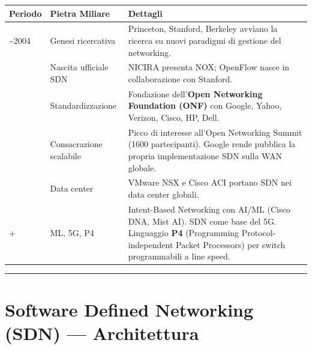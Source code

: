 \documentclass[
  italian,
  openany]{book}
\newcounter{none} %
\begin{document}
{\def\LTcaptype{none} %
\begin{longtable}[]{@{}
  >{\raggedright\arraybackslash}p{}
  >{\raggedright\arraybackslash}p{}
  >{\raggedright\arraybackslash}p{}@{}}
\toprule\noalign{}
\begin{minipage}[b]{\linewidth}\raggedright
\textbf{Periodo}
\end{minipage} & \begin{minipage}[b]{\linewidth}\raggedright
\textbf{Pietra Miliare}
\end{minipage} & \begin{minipage}[b]{\linewidth}\raggedright
\textbf{Dettagli}
\end{minipage} \\
\midrule\noalign{}
\endhead
\bottomrule\noalign{}
\endlastfoot
\textasciitilde2004 & Genesi ricercativa & Princeton, Stanford, Berkeley
avviano la ricerca su nuovi paradigmi di gestione del networking. \\
2008 & Nascita ufficiale SDN & NICIRA presenta NOX; OpenFlow nasce in
collaborazione con Stanford. \\
2011 & Standardizzazione & Fondazione dell'\textbf{Open Networking
Foundation (ONF)} con Google, Yahoo, Verizon, Cisco, HP, Dell. \\
2013 & Consacrazione scalabile & Picco di interesse all'Open Networking
Summit (1600 partecipanti). Google rende pubblica la propria
implementazione SDN sulla WAN globale. \\
2014 & Data center & VMware NSX e Cisco ACI portano SDN nei data center
globali. \\
2021+ & ML, 5G, P4 & Intent-Based Networking con AI/ML (Cisco DNA, Mist
AI). SDN come base del 5G. Linguaggio \textbf{P4} (Programming
Protocol-independent Packet Processors) per switch programmabili a line
speed. \\
\end{longtable}
}

\begin{center}\rule{0.5\linewidth}{0.5pt}\end{center}

\newpage

\chapter{Software Defined Networking (SDN) ---
Architettura}\label{software-defined-networking-sdn-architettura}
\end{document}
